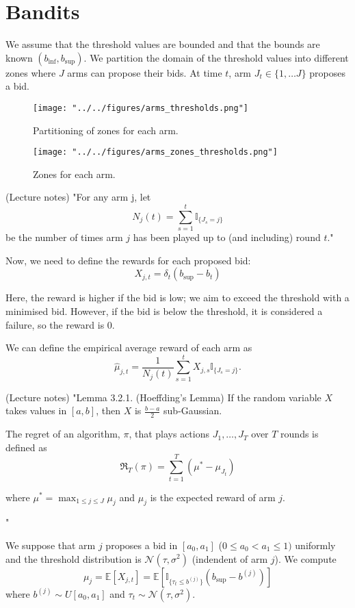 \documentclass[11pt]{article}
\begin{document}
\section*{Bandits}

We assume that the threshold values are bounded and that the bounds are known $(b_{\inf}, b_{\sup})$. We partition the domain of the threshold values into different zones where $J$ arms can propose their bids. At time $t$, arm $J_t \in \{1, \dots J\}$ proposes a bid.

\begin{figure}[H]
  \centering
  \texttt{[image: "../../figures/arms\_thresholds.png"]}
  \caption{Partitioning of zones for each arm.}
  \label{fig:partition_arm}
\end{figure}
\begin{figure}[H]
  \centering
  \texttt{[image: "../../figures/arms\_zones\_thresholds.png"]}
  \caption{Zones for each arm.}
  \label{fig:zones_arm}
\end{figure}

(Lecture notes)
"For any arm j, let
\[
 N_j(t) = \sum_{s=1}^{t} \mathbb{I}_{\{J_s = j\}}
\]
be the number of times arm $j$ has been played up to (and including) round $t$."

Now, we need to define the rewards for each proposed bid:
\[
  X_{j,t} = \delta_t (b_{\sup} - b_t)
\]

Here, the reward is higher if the bid is low; we aim to exceed the threshold 
with a minimised bid. However, if the bid is below the threshold, it is considered a failure, so the reward is 0.

We can define the empirical average reward of each arm as
\[
\hat{\mu}_{j,t} = \frac{1}{N_j(t)}\sum_{s=1}^{t} X_{j,s} \mathbb{I}_{\{J_s = j\}}.
\]

(Lecture notes)
"Lemma 3.2.1. (Hoeffding's Lemma) If the random variable $X$ takes values in $[a, b]$,
then $X$ is $\frac{b-a}{2}$ sub-Gaussian.

The regret of an algorithm, $\pi$, that plays actions $J_1, \dots, J_T$ over
$T$ rounds is defined as
\[
  \mathfrak{R}_T(\pi) = \sum_{t=1}^{T}(\mu^* - \mu_{J_t}) 
\]

where $\mu^* =  \max_{1\leq j \leq J} \mu_j$ and $\mu_{j}$ is the expected reward of arm $j$.

"

We suppose that arm $j$ proposes a bid in $[a_0, a_1]$ ($0\leq a_0 < a_1 \leq 1)$ uniformly and the threshold distribution is $\mathcal{N}(\tau, \sigma^2)$ (indendent of arm $j$). We compute
\[
\mu_j = \mathbb{E}[X_{j,t}] =  \mathbb{E}[\mathbb{I}_{\{\tau_t \leq b^{(j)}\}}(b_{\sup}-b^{(j)})]
\]
where $b^{(j)} \sim U[a_0, a_1]$ and $\tau_t \sim \mathcal{N}(\tau, \sigma^2)$.
\end{document}
